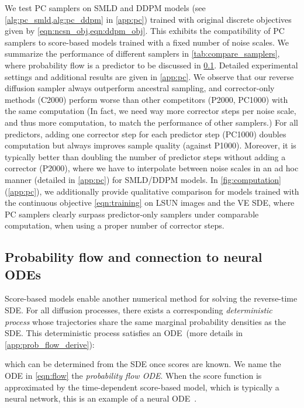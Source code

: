 \documentclass{article} \usepackage{iclr2021_conference,times}
\begin{document}
We test PC samplers on SMLD and DDPM models (see \cref{alg:pc_smld,alg:pc_ddpm} in \cref{app:pc}) trained with original discrete objectives given by \cref{eqn:ncsn_obj,eqn:ddpm_obj}. This exhibits the compatibility of PC samplers to score-based models trained with a fixed number of noise scales. We summarize the performance of different samplers in \cref{tab:compare_samplers}, where probability flow is a predictor to be discussed in \cref{sec:flow}. Detailed experimental settings and additional results are given in \cref{app:pc}. We observe that our reverse diffusion sampler always outperform ancestral sampling, and corrector-only methods (C2000) perform worse than other competitors (P2000, PC1000) with the same computation (In fact, we need way more corrector steps per noise scale, and thus more computation, to match the performance of other samplers.) For all predictors, adding one corrector step for each predictor step (PC1000) doubles computation but always improves sample quality (against P1000). Moreover, it is typically better than doubling the number of predictor steps without adding a corrector (P2000), where we have to interpolate between noise scales in an ad hoc manner (detailed in \cref{app:pc}) for SMLD/DDPM models. In \cref{fig:computation} (\cref{app:pc}), we additionally provide qualitative comparison for models trained with the continuous objective \cref{eqn:training} on  LSUN images and the VE SDE, where PC samplers clearly surpass predictor-only samplers under comparable computation, when using a proper number of corrector steps.








\subsection{Probability flow and connection to neural ODEs}\label{sec:flow}
Score-based models enable another numerical method for solving the reverse-time SDE. For all diffusion processes, there exists a corresponding \emph{deterministic process} whose trajectories share the same marginal probability densities  as the SDE. This deterministic process satisfies an ODE~(more details in \cref{app:prob_flow_derive}):

which can be determined from the SDE once scores are known. We name the ODE in \cref{eqn:flow} the \emph{probability flow ODE}.
When the score function is approximated by the time-dependent score-based model, which is typically a neural network, this is an example of a neural ODE~\citep{chen2018neural}. 
\end{document}
